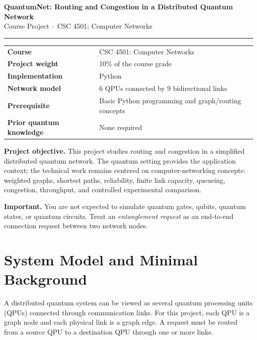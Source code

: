 \documentclass[11pt]{article}
\begin{document}
\begin{center}
    {\Large\bfseries QuantumNet: Routing and Congestion in a Distributed Quantum Network}\\[4pt]
    {\normalsize Course Project -- CSC 4501: Computer Networks}\\[6pt]
    \rule{\textwidth}{0.6pt}
\end{center}

\begin{center}
\small
\begin{tabularx}{0.90\textwidth}{@{}>{\bfseries}p{} X@{}}
Course & CSC 4501: Computer Networks \\
Project weight & 10\% of the course grade \\
Implementation & Python \\
Network model & 6 QPUs connected by 9 bidirectional links \\
Prerequisite & Basic Python programming and graph/routing concepts \\
Prior quantum knowledge & None required \\
\end{tabularx}
\normalsize
\end{center}

\vspace{4pt}
\textbf{Project objective.}
This project studies routing and congestion in a simplified distributed quantum network. The quantum setting provides the application context; the technical work remains centered on computer-networking concepts: weighted graphs, shortest paths, reliability, finite link capacity, queueing, congestion, throughput, and controlled experimental comparison.

\textbf{Important.}
You are not expected to simulate quantum gates, qubits, quantum states, or quantum circuits. Treat an \emph{entanglement request} as an end-to-end connection request between two network nodes.

\section{System Model and Minimal Background}

A distributed quantum system can be viewed as several quantum processing units (QPUs) connected through communication links. For this project, each QPU is a graph node and each physical link is a graph edge. A request must be routed from a source QPU to a destination QPU through one or more links.
\end{document}
